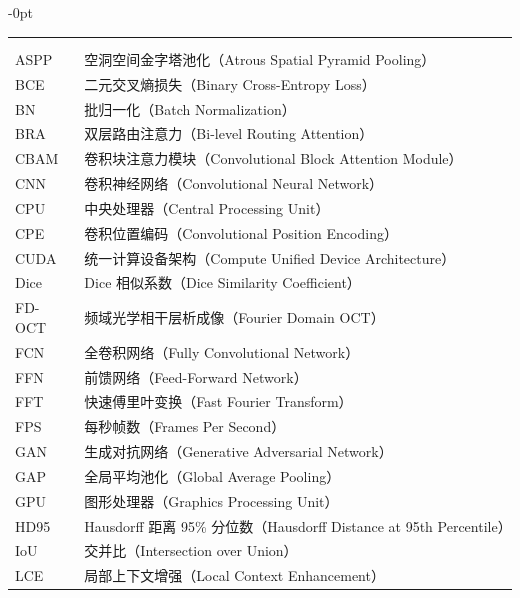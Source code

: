 \begin{signAndABC}

\begin{adjustwidth}{-\leftskip}{0pt}
\renewcommand\arraystretch{1.5}
\begin{longtable}{l@{\hspace{4em}}p{10.5cm}}
    \endfirsthead
    \endhead
    \\
    \endfoot 
    \\
    \endlastfoot

    ASPP & 空洞空间金字塔池化（Atrous Spatial Pyramid Pooling） \\
    BCE & 二元交叉熵损失（Binary Cross-Entropy Loss） \\
    BN & 批归一化（Batch Normalization） \\
    BRA & 双层路由注意力（Bi-level Routing Attention） \\
    CBAM & 卷积块注意力模块（Convolutional Block Attention Module） \\
    CNN & 卷积神经网络（Convolutional Neural Network） \\
    CPU & 中央处理器（Central Processing Unit） \\
    CPE & 卷积位置编码（Convolutional Position Encoding） \\
    CUDA & 统一计算设备架构（Compute Unified Device Architecture） \\
    Dice & Dice 相似系数（Dice Similarity Coefficient） \\
    FD-OCT & 频域光学相干层析成像（Fourier Domain OCT） \\
    FCN & 全卷积网络（Fully Convolutional Network） \\
    FFN & 前馈网络（Feed-Forward Network） \\
    FFT & 快速傅里叶变换（Fast Fourier Transform） \\
    FPS & 每秒帧数（Frames Per Second） \\
    GAN & 生成对抗网络（Generative Adversarial Network） \\
    GAP & 全局平均池化（Global Average Pooling） \\
    GPU & 图形处理器（Graphics Processing Unit） \\
    HD95 & Hausdorff 距离 95\% 分位数（Hausdorff Distance at 95th Percentile） \\
    IoU & 交并比（Intersection over Union） \\
    LCE & 局部上下文增强（Local Context Enhancement） \\

\end{longtable}
\end{adjustwidth}
\end{signAndABC}
